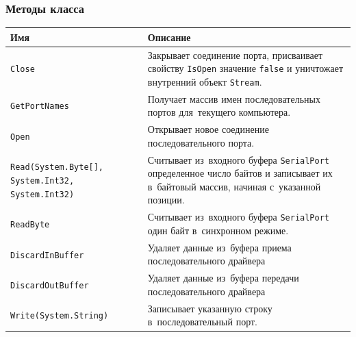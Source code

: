 \documentclass[a4paper,12pt]{article}
\begin{document}
\subsubsection*{Методы класса}
\begin{center}
\begin{longtabu} to \linewidth {|X|X[2.6]|}
\hline
\textbf{Имя}	&	\textbf{Описание}\\\hline\endhead
\texttt{Close}	&	Закрывает соединение порта, присваивает свойству \texttt{IsOpen} значение \texttt{false} и уничтожает внутренний объект \texttt{Stream}.\\\hline
\texttt{GetPortNames}	&	Получает массив имен последовательных портов для~текущего компьютера.\\\hline
\texttt{Open}	&	Открывает новое соединение последовательного порта.\\\hline
\texttt{Read(System.Byte[], System.Int32, System.Int32)}	&	Считывает из~входного буфера \texttt{SerialPort} определенное число байтов и записывает их в~байтовый массив, начиная с~указанной позиции.\\\hline
\texttt{ReadByte}	&	Считывает из~входного буфера \texttt{SerialPort} один байт в~синхронном режиме.\\\hline
\texttt{DiscardInBuffer}	&	Удаляет данные из~буфера приема последовательного драйвера\\\hline
\texttt{DiscardOutBuffer}	&	Удаляет данные из~буфера передачи последовательного драйвера\\\hline
\texttt{Write(System.String)}	&	Записывает указанную строку в~последовательный порт.\\\hline
\end{longtabu}
\end{center}
\end{document}
